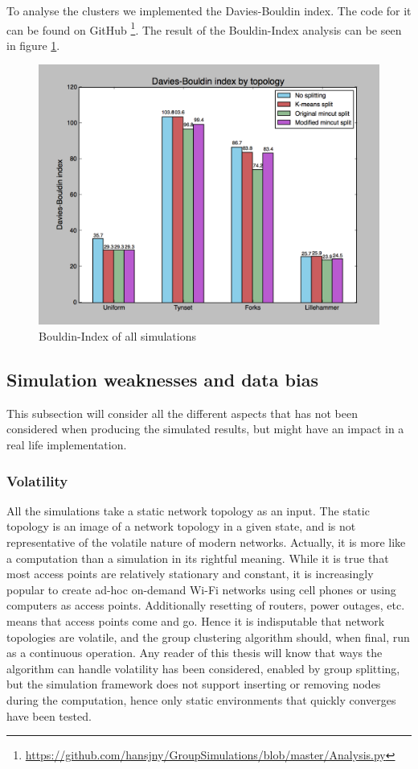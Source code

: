 To analyse the clusters we implemented the Davies-Bouldin index. The code for it can be found on GitHub \footnote{\url{https://github.com/hansjny/GroupSimulations/blob/master/Analysis.py}}.
The result of the Bouldin-Index analysis can be seen in figure \ref{fig:bouldin}.
\begin{figure}[h]
	\centering
		\includegraphics[width=14cm]{Images/Bouldin.png}
		\caption{Bouldin-Index of all simulations}%
		\label{fig:bouldin}%
\end{figure}

\subsection{Simulation weaknesses and data bias}
This subsection will consider all the different aspects that has not been considered
when producing the simulated results, but might have an impact in a real life implementation. 

\subsubsection{Volatility} 
All the simulations take a static network topology as an input. The static topology is an image of a network topology in a given state, and is not representative
of the volatile nature of modern networks. Actually, it is more like a computation than a simulation in its rightful meaning.
While it is true that most access points are relatively stationary and constant, it is increasingly popular to create ad-hoc on-demand Wi-Fi
networks using cell phones or using computers as access points. Additionally resetting of routers, power outages, etc. means that access points come and go. 
Hence it is indisputable that network topologies are volatile, and the group clustering algorithm should, when final, run as a continuous operation. 
Any reader of this thesis will know that ways the algorithm can handle volatility has been considered, enabled by group splitting,
but the simulation framework does not support inserting or removing nodes during the computation, hence only static environments that quickly converges have been tested. 

